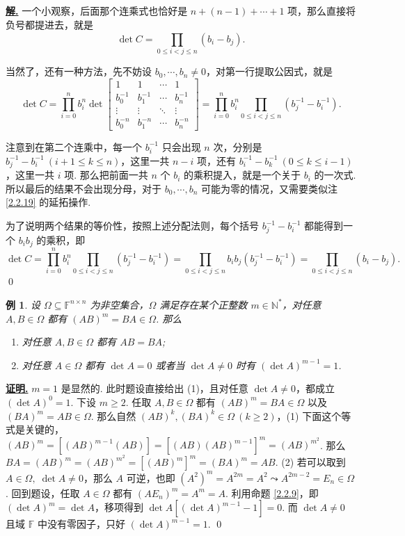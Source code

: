 \documentclass[10pt,openany]{article}
\theoremstyle{thmstyle} %
\theoremstyle{defstyle} %
\theoremstyle{prostyle} %
\theoremstyle{exastyle}
\newtheorem{example}[theorem]{例}
\theoremstyle{remstyle}
\renewenvironment{proof}[1][证明]{\par\underline{\textbf{#1.}} \;\fangsong}{\qed\par}
\newenvironment{solution}{\par\underline{\textbf{解.}} \;\fangsong}{\qed\par}
\newcommand{\F}{\mathbb{F}}
\newcommand{\n}{^{n \times n}}
\begin{document}
\begin{solution}
	一个小观察，后面那个连乘式也恰好是 \( n+(n-1)+\cdots+1 \) 项，那么直接将负号都提进去，就是
	\[ \det C=\prod_{0 \leq i<j \leq n}^{} (b_i-b_j). \]
	
	当然了，还有一种方法，先不妨设 \( b_0,\cdots,b_n \neq 0 \)，对第一行提取公因式，就是
	\[ \det C= \prod_{i=0}^{n} b_i^n \det\begin{bmatrix}
		1 & 1 & \cdots & 1 \\
		b_0^{-1} & b_1^{-1} & \cdots & b_n^{-1} \\
		\vdots & \vdots & \ddots & \vdots \\
		b_0^{-n} & b_1^{-n} & \cdots & b_n^{-n}  
	\end{bmatrix}= \prod_{i=0}^{n} b_i^n \prod_{0 \leq i<j \leq n}^{} (b_j^{-1}-b_i^{-1}). \]
	
	注意到在第二个连乘中，每一个 \( b_i^{-1} \) 只会出现 \( n \) 次，分别是 \( b_j^{-1}-b_i^{-1} \ (i+1 \leq k \leq n) \)，这里一共 \( n-i \) 项，还有 \( b_i^{-1}-b_k^{-1} \ (0 \leq k \leq i-1) \)，这里一共 \( i \) 项. 那么把前面一共 \( n \) 个 \( b_i \) 的乘积提入，就是一个关于 \( b_i \) 的一次式. 所以最后的结果不会出现分母，对于 \( b_0,\cdots,b_n  \) 可能为零的情况，又需要类似注 \ref{2.2.19} 的延拓操作.
	
	为了说明两个结果的等价性，按照上述分配法则，每个括号 \( b_j^{-1}-b_i^{-1} \) 都能得到一个 \(b_ib_j \) 的乘积，即
	\[ \det C= \prod_{i=0}^{n} b_i^n \prod_{0 \leq i<j \leq n}^{} (b_j^{-1}-b_i^{-1})= \prod_{0 \leq i<j \leq n}^{} b_ib_j (b_j^{-1}-b_i^{-1})=\prod_{0 \leq i<j \leq n}^{}  (b_i-b_j). \]
\end{solution}

\begin{example}
	设 \( \Omega \subseteq \F\n \) 为非空集合，\( \Omega \) 满足存在某个正整数 \( m \in \mathbb{N}^* \)，对任意 \( A,B \in \Omega \) 都有 \( (AB)^{m}=BA \in \Omega \). 那么
	\begin{enumerate}[(1)]
		\item 对任意 \( A,B \in \Omega \) 都有 \( AB=BA \);
		\item 对任意 \( A \in \Omega \) 都有 \( \det A=0 \) 或者当 \( \det A \neq 0 \) 时有 \( (\det A)^{m-1}=1  \).
	\end{enumerate}
\end{example}

\begin{proof}
	\( m=1 \) 是显然的. 此时题设直接给出 (1)，且对任意 \( \det A \neq 0 \)，都成立 \( (\det A)^{0}=1 \). 下设 \( m \geq 2 \). 任取 \( A,B \in \Omega \) 都有 \( (AB)^m=BA \in \Omega \) 以及 \( (BA)^m=AB \in \Omega \). 那么自然 \( (AB)^k, (BA)^k \in \Omega \ (k \geq 2) \)，(1) 下面这个等式是关键的，\( (AB)^m=[(AB)^{m-1}(AB)]=[(AB)(AB)^{m-1}]^m=(AB)^{m^2} \). 那么 \( BA=(AB)^m=(AB)^{m^2}=[(AB)^m]^m=(BA)^m=AB \). (2) 若可以取到 \( A \in \Omega, \; \det A \neq 0 \)，那么 \( A \) 可逆，也即 \( (A^2)^{m}=A^{2m}=A^2 \leadsto A^{2m-2}=E_n \in \Omega \). 回到题设，任取 \( A \in \Omega \) 都有 \( (AE_n)^m=A^m=A \). 利用命题 \ref{2.2.9}，即 \( (\det A)^{m}=\det A \)，移项得到 \( \det A [(\det A)^{m-1}-1]=0 \). 而 \( \det A \neq 0 \) 且域 \( \F \) 中没有零因子，只好 \( (\det A)^{m-1}=1 \). 
\end{proof}
\end{document}
